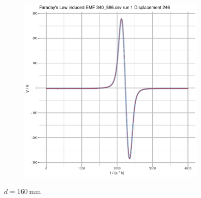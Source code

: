 \documentclass[a4paper,11pt]{article}
\begin{document}
\begin{figure}[b]
\begin{subfigure}{.5\textwidth}
\end{subfigure}
\begin{subfigure}{.7\textwidth}
    \centering
    \includegraphics[width=\textwidth,page=12]{Rplots.pdf}
\end{subfigure}
\caption{\(d = \SI{160}{\milli\metre}\)}
\end{figure}
\end{document}
